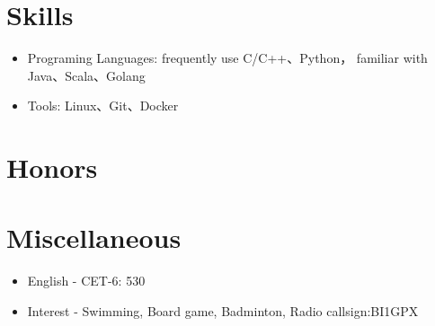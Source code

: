 \documentclass{resume}
\begin{document}
\section{Skills}
\begin{itemize}[parsep=0.5ex]
  \item Programing Languages: frequently use  C/C++、Python， familiar with  Java、Scala、Golang
  \item Tools: Linux、Git、Docker
\end{itemize}

\section{Honors}

\section{Miscellaneous}
\begin{itemize}[parsep=0.5ex]
  \item  English - CET-6: 530
  \item  Interest - Swimming, Board game, Badminton, Radio callsign:BI1GPX
\end{itemize}
\end{document}
